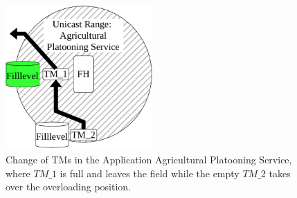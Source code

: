 \begin{figure}[H]%
	\centering
	\includegraphics[width=0.5\textwidth]{figures/platoonFULL}
	\caption{Change of \acf{TM}s in the Application Agricultural Platooning Service, where $TM\_1$
	is full and leaves the field while the empty $TM\_2$ takes over the overloading position.}
	\label{fig:PlatooningFull}%
\end{figure}


